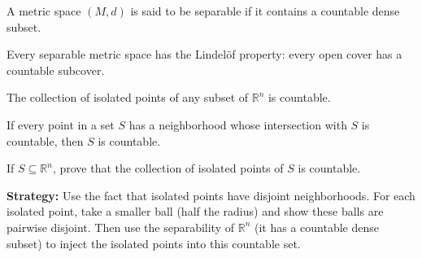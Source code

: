 \begin{definition}
A metric space $(M,d)$ is said to be separable if it contains a countable dense subset.
\end{definition}

\begin{theorem}
Every separable metric space has the Lindelöf property: every open cover has a countable subcover.
\end{theorem}

\begin{theorem}
The collection of isolated points of any subset of $\mathbb{R}^n$ is countable.
\end{theorem}

\begin{theorem}
If every point in a set $S$ has a neighborhood whose intersection with $S$ is countable, then $S$ is countable.
\end{theorem}



\begin{problembox}
If \( S \subseteq \mathbb{R}^n \), prove that the collection of isolated points of \( S \) is countable.
\end{problembox}

\noindent\textbf{Strategy:} Use the fact that isolated points have disjoint neighborhoods. For each isolated point, take a smaller ball (half the radius) and show these balls are pairwise disjoint. Then use the separability of $\mathbb{R}^n$ (it has a countable dense subset) to inject the isolated points into this countable set.

